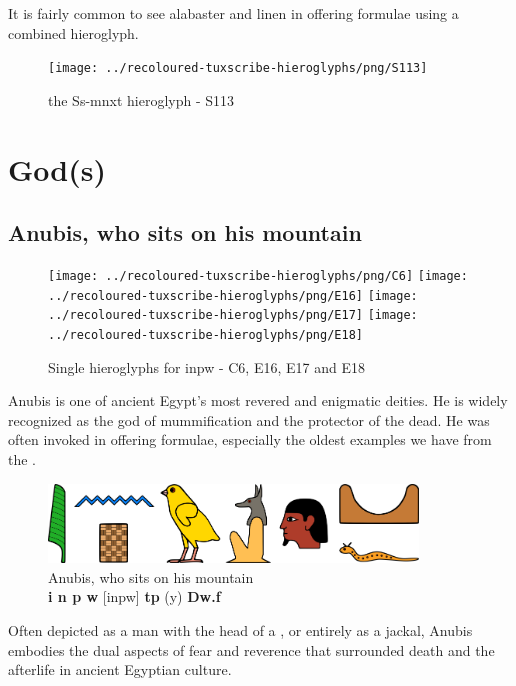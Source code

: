 It is fairly common to see alabaster and linen in offering formulae using a combined hieroglyph.

\begin{figure} [H]
	\centering
	\texttt{[image: ../recoloured-tuxscribe-hieroglyphs/png/S113]}
	\caption{the Ss-mnxt hieroglyph - S113}
\end{figure}

\section*{God(s)}

\subsection*{Anubis, who sits on his mountain}

\begin{figure} [H]
	\centering
	\texttt{[image: ../recoloured-tuxscribe-hieroglyphs/png/C6]}
	\hspace{0.03125\textwidth}
	\texttt{[image: ../recoloured-tuxscribe-hieroglyphs/png/E16]}
	\texttt{[image: ../recoloured-tuxscribe-hieroglyphs/png/E17]}
	\texttt{[image: ../recoloured-tuxscribe-hieroglyphs/png/E18]}
	\caption{Single hieroglyphs for inpw - C6, E16, E17 and E18}
\end{figure}

Anubis is one of ancient Egypt's most revered and enigmatic deities. He is widely recognized as the god of mummification and the protector of the dead. He was often invoked in offering formulae, especially the oldest examples we have from the .

\begin{figure} [H]
	\centering
	\includegraphics[width=0.875\textwidth]{../images/inpw-tpy-dwf}
	\caption{Anubis, who sits on his mountain\\\textbf{i n p w} [inpw] \textbf{tp} (y) \textbf{Dw.f}}
\end{figure}

Often depicted as a man with the head of a , or entirely as a jackal, Anubis embodies the dual aspects of fear and reverence that surrounded death and the afterlife in ancient Egyptian culture.

